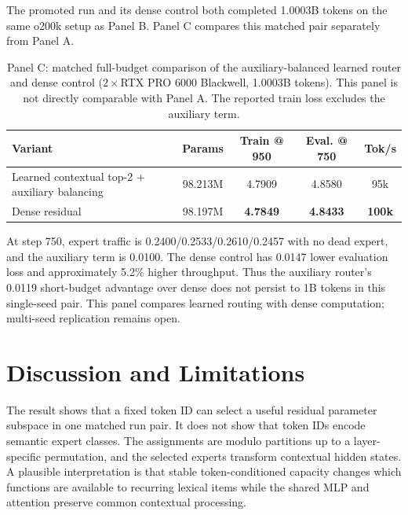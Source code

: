 \documentclass[10pt]{article}
\theoremstyle{definition}
\theoremstyle{remark}
\begin{document}
The promoted run and its dense control both completed 1.0003B tokens on the same o200k setup as Panel B. Panel C compares this matched pair separately from Panel A.

\begin{table}[H]
\centering
\small
\caption{Panel C: matched full-budget comparison of the auxiliary-balanced learned router and dense control ($2\times$RTX PRO 6000 Blackwell, 1.0003B tokens). This panel is not directly comparable with Panel A. The reported train loss excludes the auxiliary term.}
\label{tab:1b_router_promotion}
\begin{tabular}{lcccc}
\toprule
\textbf{Variant} & \textbf{Params} & \textbf{Train @ 950} & \textbf{Eval. @ 750} & \textbf{Tok/s} \\
\midrule
Learned contextual top-2 + auxiliary balancing & 98.213M & 4.7909 & 4.8580 & 95k \\
Dense residual & 98.197M & \textbf{4.7849} & \textbf{4.8433} & \textbf{100k} \\
\bottomrule
\end{tabular}
\end{table}

At step 750, expert traffic is 0.2400/0.2533/0.2610/0.2457 with no dead expert, and the auxiliary term is 0.0100. The dense control has 0.0147 lower evaluation loss and approximately 5.2\% higher throughput. Thus the auxiliary router's 0.0119 short-budget advantage over dense does not persist to 1B tokens in this single-seed pair. This panel compares learned routing with dense computation; multi-seed replication remains open.
\FloatBarrier

\section{Discussion and Limitations}
\label{sec:discussion}
\label{sec:limitations}

The result shows that a fixed token ID can select a useful residual parameter subspace in one matched run pair. It does not show that token IDs encode semantic expert classes. The assignments are modulo partitions up to a layer-specific permutation, and the selected experts transform contextual hidden states. A plausible interpretation is that stable token-conditioned capacity changes which functions are available to recurring lexical items while the shared MLP and attention preserve common contextual processing.
\end{document}
